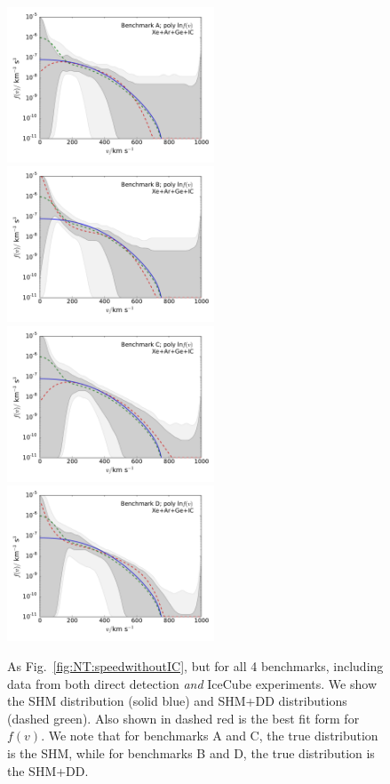 \begin{figure}[!pht]
  \centering
  \includegraphics[trim=0.5cm 0.5cm 0.5cm 0.5cm, clip,width=0.55\textwidth]{NT/BenchmarkA_poly-speed.pdf}
  \includegraphics[trim=0.5cm 0.5cm 0.5cm 0.5cm, clip,width=0.55\textwidth]{NT/BenchmarkB_poly-speed.pdf}
  \includegraphics[trim=0.5cm 0.5cm 0.5cm 0.5cm, clip,width=0.55\textwidth]{NT/BenchmarkC_poly-speed.pdf}
  \includegraphics[trim=0.5cm 0.5cm 0.5cm 0.5cm, clip,width=0.55\textwidth]{NT/BenchmarkD_poly-speed.pdf}
\caption{As Fig.~\ref{fig:NT:speedwithoutIC}, but for all 4 benchmarks, including data from both direct detection \textit{and} IceCube experiments. We show the SHM distribution (solid blue) and SHM+DD distributions (dashed green). Also shown in dashed red is the best fit form for $f(v)$. We note that for benchmarks A and C, the true distribution is the SHM, while for benchmarks B and D, the true distribution is the SHM+DD.}
\label{fig:NT:speedwithIC}
\end{figure}

